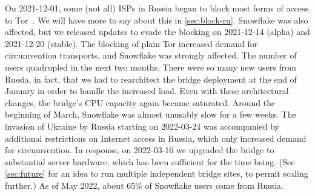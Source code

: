 \documentclass[letterpaper,twocolumn]{article}
\begin{document}
On \mbox{2021-12-01}, some (not all) ISPs in Russia began to block
most forms of access to Tor~\cite{ooni-2021-russia-blocks-tor}.
We will have more to say about this in \autoref{sec:block-ru}.
Snowflake was also affected,
but we released updates to evade the blocking on
\mbox{2021-12-14} (alpha) and
\mbox{2021-12-20} (stable).
The blocking of plain Tor increased demand for circumvention transports,
and Snowflake was strongly affected.
The number of users quadrupled in the next two months.
There were so many new users from Russia, in fact,
that we had to rearchitect the bridge deployment
at the end of January
in order to handle the increased load.
Even with these architectural changes,
the bridge's CPU capacity again became saturated.
Around the beginning of March, Snowflake was almost unusably slow for a few weeks.
The invasion of Ukraine by Russia starting on \mbox{2022-03-24}
was accompanied by additional restrictions on Internet access in Russia,
which only increased demand for circumvention.
In response, on \mbox{2022-03-16} we upgraded the bridge to substantial server hardware,
which has been sufficient for the time being.
(See \autoref{sec:future} for an idea to run multiple independent bridge sites,
to permit scaling further.)
As of May 2022, about 65\% of Snowflake users come from Russia.
%
\end{document}
